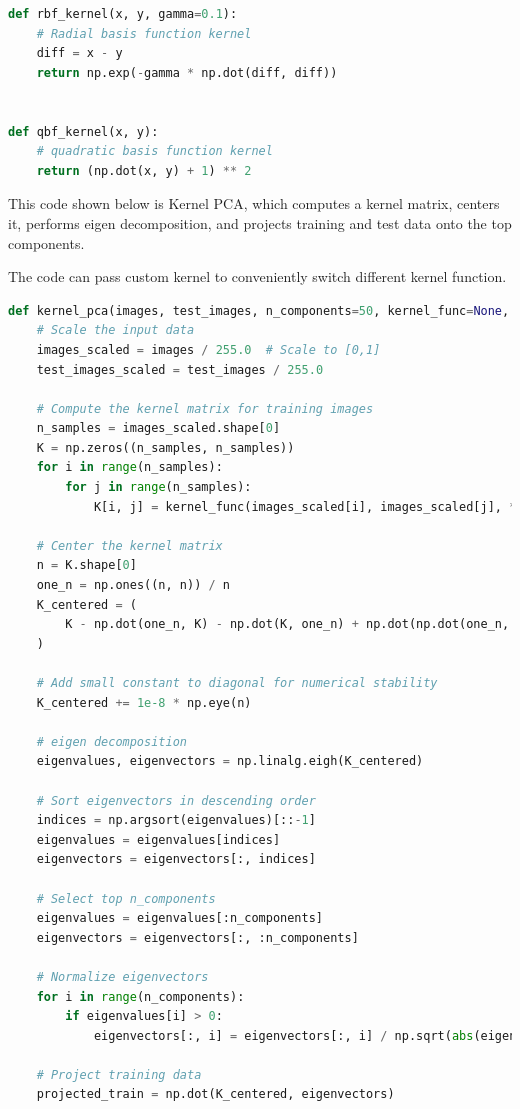 \documentclass{homework}
\begin{document}
\begin{lstlisting}[language=Python]
def rbf_kernel(x, y, gamma=0.1):
    # Radial basis function kernel
    diff = x - y
    return np.exp(-gamma * np.dot(diff, diff))


def qbf_kernel(x, y):
    # quadratic basis function kernel
    return (np.dot(x, y) + 1) ** 2
\end{lstlisting}

This code shown below is Kernel PCA, which computes a kernel matrix, centers it, performs eigen decomposition, and projects training and test data onto the top components.

The code can pass custom kernel to conveniently switch different kernel function.

\begin{lstlisting}[language=Python]
def kernel_pca(images, test_images, n_components=50, kernel_func=None, **kwargs):
    # Scale the input data
    images_scaled = images / 255.0  # Scale to [0,1]
    test_images_scaled = test_images / 255.0

    # Compute the kernel matrix for training images
    n_samples = images_scaled.shape[0]
    K = np.zeros((n_samples, n_samples))
    for i in range(n_samples):
        for j in range(n_samples):
            K[i, j] = kernel_func(images_scaled[i], images_scaled[j], **kwargs)

    # Center the kernel matrix
    n = K.shape[0]
    one_n = np.ones((n, n)) / n
    K_centered = (
        K - np.dot(one_n, K) - np.dot(K, one_n) + np.dot(np.dot(one_n, K), one_n)
    )

    # Add small constant to diagonal for numerical stability
    K_centered += 1e-8 * np.eye(n)

    # eigen decomposition
    eigenvalues, eigenvectors = np.linalg.eigh(K_centered)

    # Sort eigenvectors in descending order
    indices = np.argsort(eigenvalues)[::-1]
    eigenvalues = eigenvalues[indices]
    eigenvectors = eigenvectors[:, indices]

    # Select top n_components
    eigenvalues = eigenvalues[:n_components]
    eigenvectors = eigenvectors[:, :n_components]

    # Normalize eigenvectors
    for i in range(n_components):
        if eigenvalues[i] > 0:
            eigenvectors[:, i] = eigenvectors[:, i] / np.sqrt(abs(eigenvalues[i]))

    # Project training data
    projected_train = np.dot(K_centered, eigenvectors)


\end{lstlisting}
\end{document}
